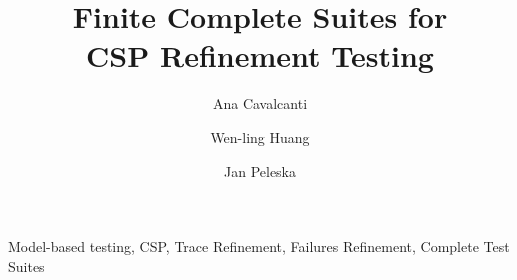 \documentclass[runningheads,a4paper]{llncs}
\newcommand{\keywords}[1]{\par\addvspace\baselineskip
\noindent\keywordname\enspace\ignorespaces#1}
\begin{document}
\mainmatter  %

\title{Finite Complete Suites for \\ CSP Refinement Testing}



%
%
\author{
Ana Cavalcanti \and  Wen-ling Huang \and Jan Peleska
}
%


\maketitle

\begin{abstract}
 
\end{abstract}
\keywords{Model-based testing, CSP, Trace Refinement, Failures Refinement, Complete Test Suites}






















\end{document}
